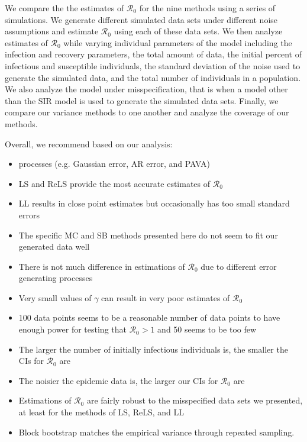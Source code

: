 \documentclass[12pt]{article}
\newcommand{\wxxsir}{nine } %
\newcommand{\rr}{\ensuremath{\mathcal{R}_0}}
\begin{document}
We compare the the estimates of $\rr$ for the \wxxsir methods using a series of simulations.  We generate different simulated data sets under different noise assumptions and estimate $\rr$ using each of these data sets.  We then analyze estimates of $\rr$ while varying individual parameters of the model including the infection and recovery parameters, the total amount of data, the initial percent of infectious and susceptible individuals, the standard deviation of the noise used to generate the simulated data, and the total number of individuals in a population.  We also analyze the model under misspecification, that is when a model other than the SIR model is used to generate the simulated data sets.  Finally, we compare our variance methods to one another and analyze the coverage of our methods.


Overall, we recommend based on our analysis:
\begin{itemize}
\item processes (e.g. Gaussian error, AR error, and PAVA)
  \item LS and ReLS provide the most accurate estimates of $\rr$
  \item LL results in close point estimates but occasionally has too small standard errors
  \item The specific MC and SB methods presented here do not seem to fit our generated data well
  \item There is not much difference in estimations of $\rr$ due to different error generating processes
  \item Very small values of $\gamma$ can result in very poor estimates of $\rr$
  \item 100 data points seems to be a reasonable number of data points to have enough power for testing that $\rr > 1$ and 50 seems to be too few
  \item The larger the number of initially infectious individuals is, the smaller the CIs for $\rr$ are
  \item The noisier the epidemic data is, the larger our CIs for $\rr$ are
  \item Estimations of $\rr$ are fairly robust to the misspecified data sets we presented, at least for the methods of LS, ReLS, and LL
  \item Block bootstrap matches the empirical variance through repeated sampling.
  \end{itemize}
\end{document}
